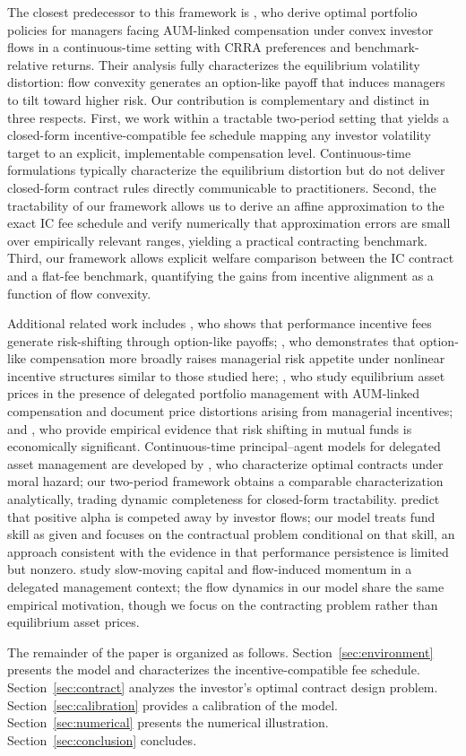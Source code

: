 The closest predecessor to this framework is \citet{basak2007optimal}, who derive optimal portfolio policies for managers facing AUM-linked compensation under convex investor flows in a continuous-time setting with CRRA preferences and benchmark-relative returns. Their analysis fully characterizes the equilibrium volatility distortion: flow convexity generates an option-like payoff that induces managers to tilt toward higher risk. Our contribution is complementary and distinct in three respects. First, we work within a tractable two-period setting that yields a closed-form incentive-compatible fee schedule mapping any investor volatility target to an explicit, implementable compensation level. Continuous-time formulations typically characterize the equilibrium distortion but do not deliver closed-form contract rules directly communicable to practitioners. Second, the tractability of our framework allows us to derive an affine approximation to the exact IC fee schedule and verify numerically that approximation errors are small over empirically relevant ranges, yielding a practical contracting benchmark. Third, our framework allows explicit welfare comparison between the IC contract and a flat-fee benchmark, quantifying the gains from incentive alignment as a function of flow convexity.

Additional related work includes \citet{Starks1987}, who shows that performance incentive fees generate risk-shifting through option-like payoffs; \citet{Carpenter2000}, who demonstrates that option-like compensation more broadly raises managerial risk appetite under nonlinear incentive structures similar to those studied here; \citet{CuocoKaniel2011}, who study equilibrium asset prices in the presence of delegated portfolio management with AUM-linked compensation and document price distortions arising from managerial incentives; and \citet{HuangSialmZhang2011}, who provide empirical evidence that risk shifting in mutual funds is economically significant. Continuous-time principal--agent models for delegated asset management are developed by \citet{OuYang2003}, who characterize optimal contracts under moral hazard; our two-period framework obtains a comparable characterization analytically, trading dynamic completeness for closed-form tractability. \citet{berk2004mutual} predict that positive alpha is competed away by investor flows; our model treats fund skill as given and focuses on the contractual problem conditional on that skill, an approach consistent with the evidence in \citet{carhart1997persistence} that performance persistence is limited but nonzero. \citet{VayanosWoolley2013} study slow-moving capital and flow-induced momentum in a delegated management context; the flow dynamics in our model share the same empirical motivation, though we focus on the contracting problem rather than equilibrium asset prices.

The remainder of the paper is organized as follows. Section~\ref{sec:environment} presents the model and characterizes the incentive-compatible fee schedule. Section~\ref{sec:contract} analyzes the investor's optimal contract design problem. Section~\ref{sec:calibration} provides a calibration of the model. Section~\ref{sec:numerical} presents the numerical illustration. Section~\ref{sec:conclusion} concludes.
